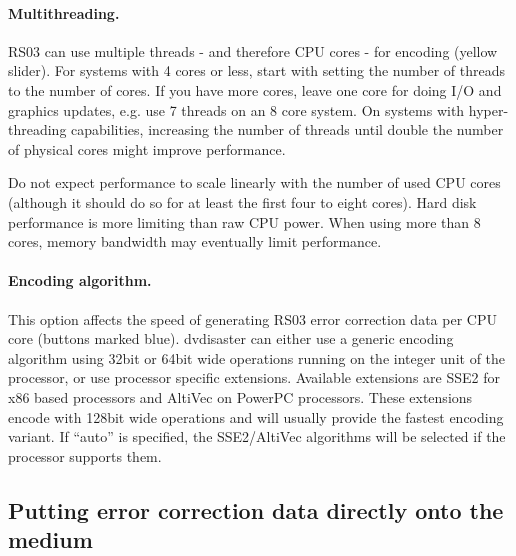 \paragraph{Multithreading.} RS03 can use multiple threads - and
therefore CPU cores - for encoding (yellow slider). For systems with 4 cores
or less, start with setting the number of threads to the number of cores.
If you have more cores, leave one core for doing I/O and graphics updates,
e.g. use 7 threads on an 8 core system. On systems with hyper-threading
capabilities, increasing the number of threads until double the number
of physical cores might improve performance.

\smallskip

Do not expect performance to scale linearly with the number of used
CPU cores (although it should do so for at least the first four to
eight cores). Hard disk performance is more limiting than raw CPU power.
When using more than 8 cores, memory bandwidth may eventually limit performance.

\paragraph{Encoding algorithm.} This option affects the speed of
generating RS03 error correction data per CPU core (buttons marked blue).
dvdisaster can either use a generic encoding algorithm using 32bit or 64bit
wide operations running on the integer unit of the processor,
or use processor specific extensions.
Available extensions are SSE2 for x86 based processors and AltiVec on
PowerPC processors. These extensions encode with 128bit wide operations
and will usually provide the fastest encoding variant.
If ``auto'' is specified, the SSE2/AltiVec algorithms will be selected
if the processor supports them. 

\newpage

\subsection{Putting error correction data directly onto the medium}
\label{howto-augment}

